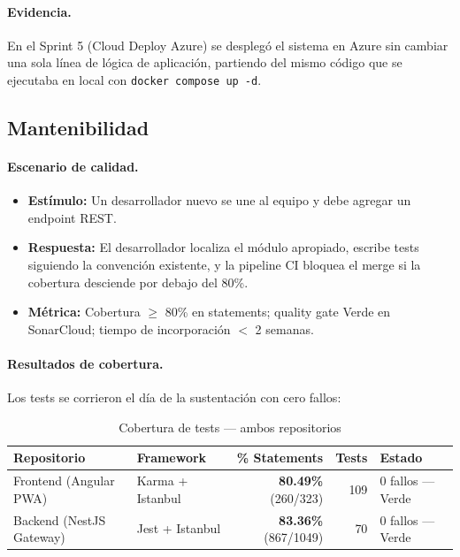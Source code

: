 \documentclass[12pt,a4paper,oneside]{article}
\begin{document}
\paragraph{Evidencia.} En el Sprint 5 (Cloud Deploy Azure) se despleg\'o el sistema en Azure sin cambiar una sola l\'inea de l\'ogica de aplicaci\'on, partiendo del mismo c\'odigo que se ejecutaba en local con \texttt{docker compose up -d}.

\subsection{Mantenibilidad}

\paragraph{Escenario de calidad.}
\begin{itemize}[leftmargin=*]
  \item \textbf{Est\'imulo:} Un desarrollador nuevo se une al equipo y debe agregar un endpoint REST.
  \item \textbf{Respuesta:} El desarrollador localiza el m\'odulo apropiado, escribe tests siguiendo la convenci\'on existente, y la pipeline CI bloquea el merge si la cobertura desciende por debajo del 80\%.
  \item \textbf{M\'etrica:} Cobertura $\geq$ 80\% en statements; quality gate Verde en SonarCloud; tiempo de incorporaci\'on $<$ 2 semanas.
\end{itemize}

\paragraph{Resultados de cobertura.} Los tests se corrieron el d\'ia de la sustentaci\'on con cero fallos:

\begin{table}[H]
\centering
\caption{Cobertura de tests --- ambos repositorios}
\label{tab:cobertura}
\small
\begin{tabular}{llrrl}
\toprule
\textbf{Repositorio} & \textbf{Framework} & \textbf{\% Statements} & \textbf{Tests} & \textbf{Estado} \\
\midrule
Frontend (Angular PWA) & Karma + Istanbul & \textbf{80.49\%} (260/323) & 109 & 0 fallos --- Verde \\
Backend (NestJS Gateway) & Jest + Istanbul  & \textbf{83.36\%} (867/1049) & 70 & 0 fallos --- Verde \\
\bottomrule
\end{tabular}
\end{table}
\end{document}
